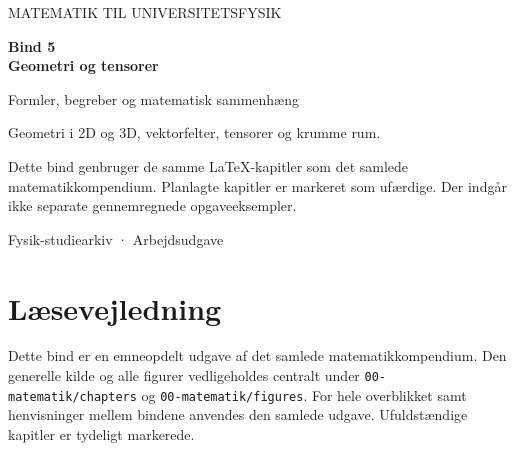 \documentclass[11pt,a4paper,oneside]{book}
\begin{document}
\frontmatter
\begin{titlepage}
\centering
\vspace*{30mm}
{\sffamily\color{arkivblaa}\Large MATEMATIK TIL UNIVERSITETSFYSIK\par}
\vspace{16mm}
{\Huge\bfseries Bind 5\\[6mm]Geometri og tensorer\par}
\vspace{13mm}
{\Large Formler, begreber og matematisk sammenhæng\par}
\vfill
\begin{minipage}{0.8\textwidth}
Geometri i 2D og 3D, vektorfelter, tensorer og krumme rum.

Dette bind genbruger de samme LaTeX-kapitler som det samlede matematikkompendium. Planlagte kapitler er markeret som ufærdige. Der indgår ikke separate gennemregnede opgaveeksempler.
\end{minipage}
\vspace{14mm}
{\small Fysik-studiearkiv · Arbejdsudgave\par}
\end{titlepage}
\chapter*{Læsevejledning}
Dette bind er en emneopdelt udgave af det samlede matematikkompendium. Den generelle kilde og alle figurer vedligeholdes centralt under \texttt{00-matematik/chapters} og \texttt{00-matematik/figures}. For hele overblikket samt henvisninger mellem bindene anvendes den samlede udgave. Ufuldstændige kapitler er tydeligt markerede.
\begingroup\small\tableofcontents\endgroup
\mainmatter




\end{document}
